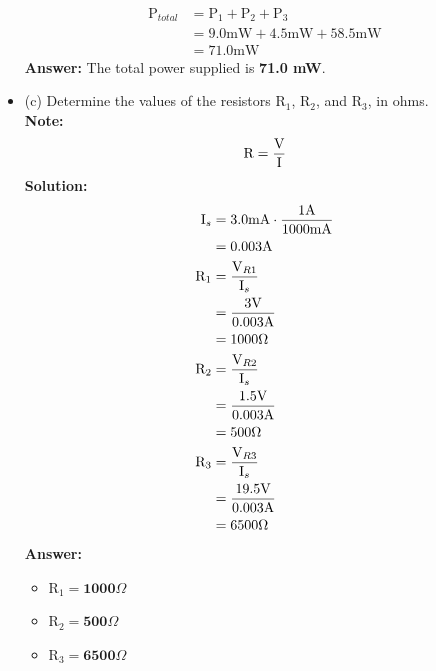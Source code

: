 \documentclass{article}
\begin{document}
\begin{itemize}
\begin{align*}
			\text{P}_{total} &= \text{P}_1 + \text{P}_2 + \text{P}_3 \\
				&= 9.0 \text{mW} + 4.5 \text{mW} + 58.5 \text{mW} \\
			 	&= 71.0 \text{mW}
		\end{align*}
		\textbf{Answer:} The total power supplied is \textbf{71.0 mW}.
	\item (c) Determine the values of the resistors $\text{R}_1$, $\text{R}_2$, and $\text{R}_3$, in ohms. \\
		\textbf{Note:} \\
		\begin{equation}
			\text{R} = { \text{V} \over \text{I} }
		\end{equation}
		\textbf{Solution:} \\
		\begin{align*}
			\text{I}_s &= 3.0 \text{mA} \cdot {1 \text{A} \over 1000 \text{mA} } \\
				&= 0.003 \text{A} \\
			\text{R}_1 &= { \text{V}_{R1} \over \text{I}_s } \\
				&= { 3 \text{V} \over 0.003 \text{A} } \\
				&= 1000 \Omega \\
			\text{R}_2 &= { \text{V}_{R2} \over \text{I}_s } \\
				&= { 1.5 \text{V} \over 0.003 \text{A} } \\
				&= 500 \Omega \\
			\text{R}_3 &= { \text{V}_{R3} \over \text{I}_s } \\
				&= { 19.5 \text{V} \over 0.003 \text{A} } \\
				&= 6500 \Omega \\
		\end{align*}
		\textbf{Answer:}
		\begin{itemize}
			\item \textbf{$\text{R}_1 = \textbf{1000} \Omega$}
			\item \textbf{$\text{R}_2 = \textbf{500} \Omega$}
			\item \textbf{$\text{R}_3 = \textbf{6500} \Omega$}
		\end{itemize}
\end{itemize}

\newpage
\end{document}
